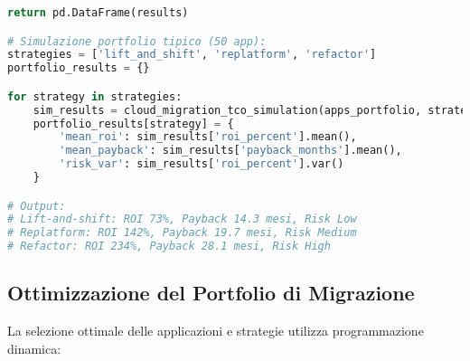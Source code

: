 \begin{lstlisting}[language=Python, caption=Simulazione TCO migrazione cloud]
    return pd.DataFrame(results)

# Simulazione portfolio tipico (50 app):
strategies = ['lift_and_shift', 'replatform', 'refactor']
portfolio_results = {}

for strategy in strategies:
    sim_results = cloud_migration_tco_simulation(apps_portfolio, strategy)
    portfolio_results[strategy] = {
        'mean_roi': sim_results['roi_percent'].mean(),
        'mean_payback': sim_results['payback_months'].mean(),
        'risk_var': sim_results['roi_percent'].var()
    }

# Output:
# Lift-and-shift: ROI 73%, Payback 14.3 mesi, Risk Low
# Replatform: ROI 142%, Payback 19.7 mesi, Risk Medium  
# Refactor: ROI 234%, Payback 28.1 mesi, Risk High
\end{lstlisting}

\subsection{Ottimizzazione del Portfolio di Migrazione}

La selezione ottimale delle applicazioni e strategie utilizza programmazione dinamica:

